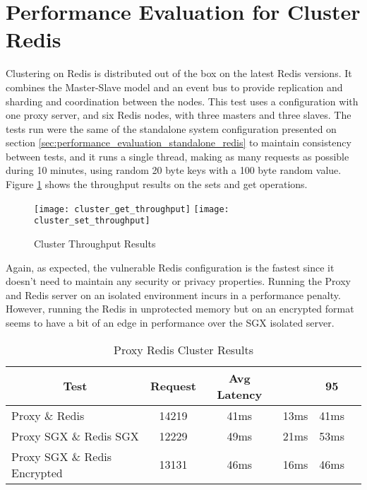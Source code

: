 \section{Performance Evaluation for Cluster Redis}
\label{sec:performance_evaluation_cluster_redis}

Clustering on Redis is distributed out of the box on the latest Redis versions. It combines the Master-Slave model and an event bus to provide replication and sharding and coordination between the nodes. This test uses a configuration with one proxy server, and six Redis nodes, with three masters and three slaves. The tests run were the same of the standalone system configuration presented on section \ref{sec:performance_evaluation_standalone_redis} to maintain consistency between tests, and it runs a single thread, making as many requests as possible during 10 minutes, using random 20 byte keys with a 100 byte random value. Figure \ref{fig:cluster_throughput_results} shows the throughput results on the sets and get operations.

\begin{figure}[htbp]
  \centering
    {\texttt{[image: cluster\_get\_throughput]}}%
    {\texttt{[image: cluster\_set\_throughput]}}%
  \caption{Cluster Throughput Results}
  \label{fig:cluster_throughput_results}
\end{figure}

Again, as expected, the vulnerable Redis configuration is the fastest since it doesn't need to maintain any security or privacy properties. Running the Proxy and Redis server on an isolated environment incurs in a performance penalty. However, running the Redis in unprotected memory but on an encrypted format seems to have a bit of an edge in performance over the \gls{SGX} isolated server.

\begin{table}[ht]
	\caption{Proxy Redis Cluster Results}
	\label{tab:proxy_redis_cluster_latency_results}
\centering
\begin{tabular}{lccccc}
	\toprule
	\multicolumn{1}{c}{\textbf{Test}} & \pmb{\#}\textbf{Request} & \textbf{Avg Latency} & \pmb{\ensuremath{\sigma}} & \textbf{95}\pmb{\%} \\
	\midrule
		Proxy \& Redis & 14219 & 41ms & 13ms & 41ms  				\\
		Proxy SGX \& Redis SGX & 12229 & 49ms & 21ms & 53ms  		\\
		Proxy SGX \& Redis Encrypted & 13131 & 46ms & 16ms & 46ms 	\\
	\bottomrule
\end{tabular}
\end{table}

